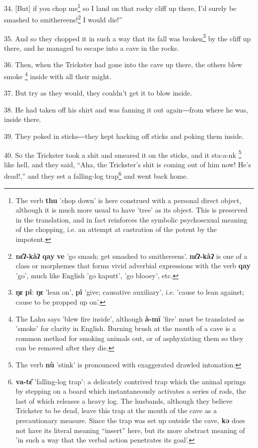 34. [But] if you chop me\footnote{The verb \textbf{thu} 'chop down' is here construed with a personal direct object, although it is much more usual to have 'tree' as its object. This is preserved in the translation, and in fact reinforces the symbolic psychosexual meaning of the chopping, i.e. an attempt at castration of the potent by the impotent.} so I land on that rocky cliff up there, I'd surely
be smashed to smithereens!\footnote{\textbf{nɛ̂ʔ-kàʔ} \textbf{qay} \textbf{ve} 'go smash; get smashed to smithereens'. \textbf{nɛ̂ʔ-kàʔ} is one of a class or morphemes that forms vivid adverbial expressions with the verb \textbf{qay} 'go', much like English 'go kaputt', 'go blooey', etc.} I would die!''

35. And so they chopped it in such a way that its fall was broken\footnote{\textbf{ŋɛ} \textbf{pî}: \textbf{ŋɛ} 'lean on', \textbf{pî} 'give; causative auxiliary', i.e. 'cause to lean against; cause to be propped up on'.} by the cliff
up there, and he managed to escape into a cave in the rocks.

36. Then, when the Trickster had gone into the cave up there, the others blew smoke
\footnote{The Lahu says 'blew fire inside', although \textbf{à-mī} 'fire' must be translated as 'smoke' for clarity in English. Burning brush at the mouth of a cave is a common method for smoking animals out, or of asphyxiating them so they can be removed after they die.} inside with all their might.

37. But try as they would, they couldn't get it to blow inside.

38. He had taken off his shirt and was fanning it out again―from where he was,
inside there.

39. They poked in sticks―they kept hacking off sticks and poking them inside.

40. So the Trickster took a shit and smeared it on the sticks, and it sta-a-nk
\footnote{The verb \textbf{nù} 'stink' is pronounced with exaggerated drawled intonation.} like hell, and they said, ``Aha, the Trickster's shit is coming out of him
now! He's dead!,'' and they set a falling-log trap\footnote{\textbf{va-tɛ̂} 'falling-log trap': a delicately contrived trap which the animal springs by stepping on a board which instantaneously activates a series of rods, the last of which releases a heavy log. The husbands, although they believe Trickster to be dead, leave this trap at the mouth of the cave as a precautionary measure. Since the trap was set up outside the cave, \textbf{kə} does not have its literal meaning ``insert'' here, but its more abstract meaning of 'in such a way that the verbal action penetrates its goal'.} and went back home.

